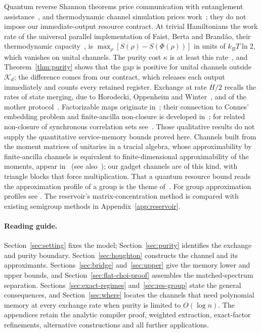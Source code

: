 \documentclass[11pt,a4paper]{article}
\theoremstyle{plain}
\theoremstyle{definition}
\theoremstyle{remark}
\begin{document}
Quantum reverse Shannon theorems price communication with entanglement
assistance~\cite{BDHSW2014,BCR2011}, and thermodynamic channel simulation prices
work~\cite{FBB2019,FaistRenner2018}; they do not impose our immediate-output resource contract. At trivial Hamiltonians the work rate of the
universal parallel implementation of Faist, Berta and Brand\~ao, their thermodynamic capacity~\cite{FBB2019}, is
$\max_\rho[S(\rho)-S(\Phi(\rho))]$ in units of $k_BT\ln2$, which vanishes on unital channels. The purity cost $\kappa$ is at least this
rate~\cite[Proposition~7.4]{Douglas2026closed}, and Theorem~\ref{thm:purity} shows that the gap is positive for unital channels outside
$\mathcal K_d$; the difference comes from our contract, which releases each output immediately and counts every retained register. Exchange at
rate $H/2$ recalls the rates of state merging, due to Horodecki, Oppenheim and Winter~\cite{HOW2005,HOW2007}, and of the mother
protocol~\cite{ADHW2009}.
Factorizable maps originate in~\cite{AD2006}; their connection to Connes'
embedding problem and finite-ancilla non-closure is developed
in~\cite{HaagerupMusat2011,HaagerupMusat2015,MusatRordam2020,Musat2025}; for related non-closure of synchronous correlation sets
see~\cite{Russell2019}.
Those qualitative results do not supply the quantitative service-memory bounds
proved here. Channels built from the moment matrices of unitaries in a tracial algebra, whose approximability by finite-ancilla channels is
equivalent to finite-dimensional approximability of the moments, appear in~\cite{HaagerupMusat2015,MusatRordam2020} (see
also~\cite[Proposition~3.9]{Musat2025}); our gadget channels are of this kind, with triangle blocks that force multiplication. That a
quantum resource bound reads the approximation profile of a group is the theme of~\cite{SlofstraVidick2018}. For group approximation profiles see
\cite{Cornulier2013,ArzhantsevaCherix2020,SlofstraVidick2018,Slofstra2018,BCJM2023}.
The reservoir's matrix-concentration method is compared with existing
semigroup methods in Appendix~\ref{app:reservoir}.

\paragraph{Reading guide.}
Section~\ref{sec:setting} fixes the model; Section~\ref{sec:purity} identifies
the exchange and purity boundary. Section~\ref{sec:houghton} constructs the
channel and its approximants. Sections~\ref{sec:bridge} and~\ref{sec:upper}
give the memory lower and upper bounds, and Section~\ref{sec:flat-choi-proof}
assembles the matched-spectrum separation. Sections~\ref{sec:exact-regimes}
and~\ref{sec:res-group} state the general consequences, and Section~\ref{sec:where}
locates the channels that need polynomial memory at every exchange rate when purity is limited to $O(\log n)$. The appendices retain
the analytic compiler proof, weighted extraction, exact-factor refinements,
alternative constructions and all further applications.
\end{document}
